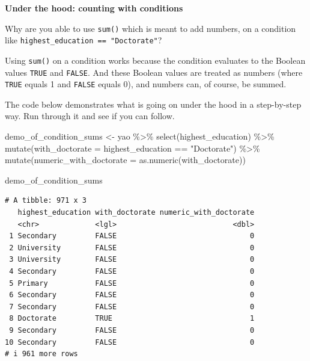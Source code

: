 \documentclass[
  letterpaper,
  DIV=11,
  numbers=noendperiod]{scrreprt}
\newenvironment{Shaded}{\begin{snugshade}}{\end{snugshade}}
\newcommand{\AttributeTok}[1]{\textcolor[rgb]{0.40,0.45,0.13}{#1}}
\newcommand{\FunctionTok}[1]{\textcolor[rgb]{0.28,0.35,0.67}{#1}}
\newcommand{\NormalTok}[1]{\textcolor[rgb]{0.00,0.23,0.31}{#1}}
\newcommand{\OtherTok}[1]{\textcolor[rgb]{0.00,0.23,0.31}{#1}}
\newcommand{\SpecialCharTok}[1]{\textcolor[rgb]{0.37,0.37,0.37}{#1}}
\newcommand{\StringTok}[1]{\textcolor[rgb]{0.13,0.47,0.30}{#1}}
\begin{document}
\begin{tcolorbox}[enhanced jigsaw, titlerule=0mm, colback=white, left=2mm, breakable, opacitybacktitle=0.6, colbacktitle=quarto-callout-note-color!10!white, colframe=quarto-callout-note-color-frame, bottomtitle=1mm, opacityback=0, coltitle=black, arc=.35mm, toptitle=1mm, title=\textcolor{quarto-callout-note-color}{\faInfo}\hspace{0.5em}{Challenge}, leftrule=.75mm, toprule=.15mm, bottomrule=.15mm, rightrule=.15mm]

\textbf{Under the hood: counting with conditions}

Why are you able to use \texttt{sum()} which is meant to add numbers, on
a condition like \texttt{highest\_education\ ==\ "Doctorate"}?

Using \texttt{sum()} on a condition works because the condition
evaluates to the Boolean values \texttt{TRUE} and \texttt{FALSE}. And
these Boolean values are treated as numbers (where \texttt{TRUE} equals
1 and \texttt{FALSE} equals 0), and numbers can, of course, be summed.

The code below demonstrates what is going on under the hood in a
step-by-step way. Run through it and see if you can follow.

\begin{Shaded}
\begin{Highlighting}[]
\NormalTok{demo\_of\_condition\_sums }\OtherTok{\textless{}{-}}\NormalTok{ yao }\SpecialCharTok{\%\textgreater{}\%} 
  \FunctionTok{select}\NormalTok{(highest\_education) }\SpecialCharTok{\%\textgreater{}\%} 
  \FunctionTok{mutate}\NormalTok{(}\AttributeTok{with\_doctorate =}\NormalTok{ highest\_education }\SpecialCharTok{==} \StringTok{"Doctorate"}\NormalTok{) }\SpecialCharTok{\%\textgreater{}\%} 
  \FunctionTok{mutate}\NormalTok{(}\AttributeTok{numeric\_with\_doctorate =} \FunctionTok{as.numeric}\NormalTok{(with\_doctorate))}

\NormalTok{demo\_of\_condition\_sums}
\end{Highlighting}
\end{Shaded}

\begin{verbatim}
# A tibble: 971 x 3
   highest_education with_doctorate numeric_with_doctorate
   <chr>             <lgl>                           <dbl>
 1 Secondary         FALSE                               0
 2 University        FALSE                               0
 3 University        FALSE                               0
 4 Secondary         FALSE                               0
 5 Primary           FALSE                               0
 6 Secondary         FALSE                               0
 7 Secondary         FALSE                               0
 8 Doctorate         TRUE                                1
 9 Secondary         FALSE                               0
10 Secondary         FALSE                               0
# i 961 more rows
\end{verbatim}


\end{tcolorbox}
\end{document}
